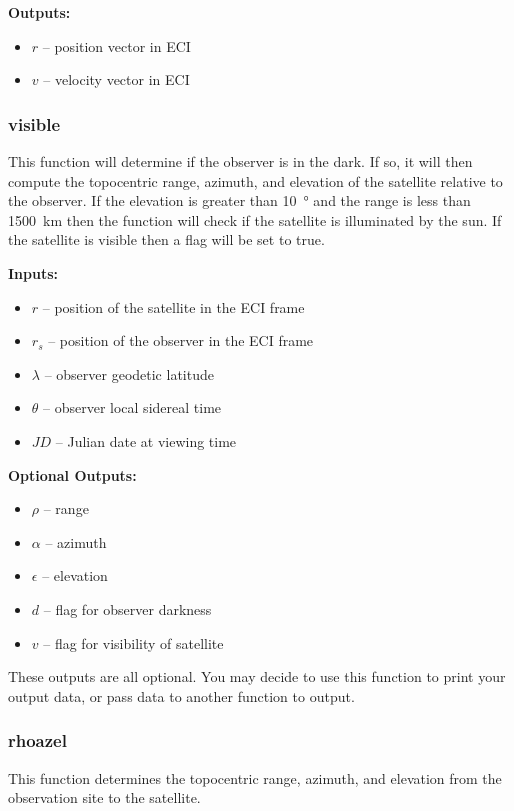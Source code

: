 \documentclass[11pt, reqno]{article}    %
\begin{document}
\noindent \textbf{Outputs: }
\begin{itemize}
    \item \( r \) --  position vector in ECI
    \item \( v \) -- velocity vector in ECI
\end{itemize}

\subsubsection*{\textbf{visible} }
This function will determine if the observer is in the dark.
If so, it will then compute the topocentric range, azimuth, and elevation of the satellite relative to the observer.
If the elevation is greater than \SI{10}{\degree} and the range is less than \SI{1500}{\kilo\meter} then the function will check if the satellite is illuminated by the sun.
If the satellite is visible then a flag will be set to true.

\noindent \textbf{Inputs: }
\begin{itemize}
    \item \( r \) --  position of the satellite in the ECI frame
    \item \( r_s \) -- position of the observer in the ECI frame
    \item \( \lambda \) -- observer geodetic latitude
    \item \( \theta \) -- observer local sidereal time
    \item \( JD \) -- Julian date at viewing time
\end{itemize}

\noindent \textbf{Optional Outputs: }
\begin{itemize}
    \item \( \rho \) -- range 
    \item \( \alpha \) -- azimuth
    \item \( \epsilon \) -- elevation
    \item \( d \) -- flag for observer darkness
    \item \( v \) -- flag for visibility of satellite
\end{itemize}

These outputs are all optional. 
You may decide to use this function to print your output data, or pass data to another function to output. 

\subsubsection*{rhoazel}
This function determines the topocentric range, azimuth, and elevation from the observation site to the satellite.
\end{document}
